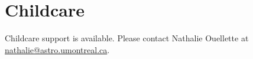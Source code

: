 \section*{Childcare}
Childcare support is available. Please contact Nathalie Ouellette at \href{mailto:nathalie@astro.umontreal.ca}{nathalie@astro.umontreal.ca}.